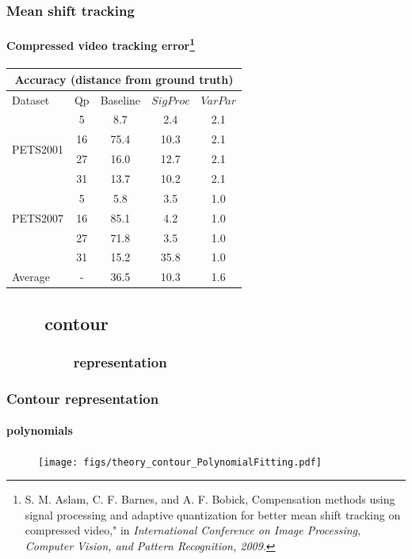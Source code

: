 \begin{frame}
\frametitle{Mean shift tracking}
\framesubtitle{Compressed video tracking error\tiny{\footnote{S. M. Aslam, C. F. Barnes, and A. F. Bobick, Compensation methods using signal processing and adaptive quantization for better mean shift tracking on compressed video," in \emph{International Conference on Image Processing, Computer Vision, and Pattern Recognition, 2009}.}}}
\logoCSIPCPL\mypagenum
	\begin{table}
		\centering
		\begin{tabular}{|l|c|c|c|c|}
			\hline
			\multicolumn{5}{|c|}{Accuracy (distance from ground truth)} \\
			\hline
			Dataset & Qp & Baseline & $SigProc$  & $VarPar$\\ 
			\hline
			\multirow{4}{*}{PETS2001} 
				&5  & 8.7 	&   2.4 &   2.1 \\
				&16 & 75.4 &  10.3 &   2.1\\
				&27 &16.0 	&  12.7 &   2.1\\
				&31 &13.7 &  10.2 &   2.1\\
			\hline
			\multirow{3}{*}{PETS2007} 
				&5 &5.8 &   3.5 &   1.0\\
				&16 &85.1 &   4.2 &   1.0\\
				&27 &71.8 &   3.5 &   1.0\\
				&31 &15.2 &  35.8 &   1.0\\
			\hline
			\multirow{1}{*}{Average}
			& - & 36.5 & 10.3 & 1.6 \\  
			\hline
		\end{tabular}
	\end{table}
\end{frame}



\subsection{\ \ \ \ contour}

\subsubsection{\ \ \ \ \ \ \ \ \   representation}

\begin{frame}
\frametitle{Contour representation}
\framesubtitle{polynomials}
\logoCSIPCPL\mypagenum
	\begin{figure}
		\texttt{[image: figs/theory\_contour\_PolynomialFitting.pdf]}
	\end{figure}
\end{frame}



